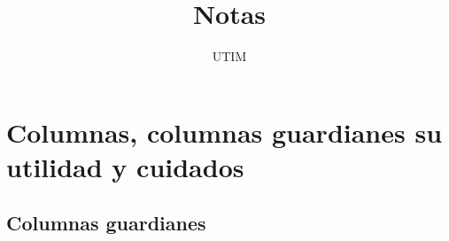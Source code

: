 \documentclass[11pt]{beamer}
\begin{document}
    \author{UTIM}
    \title{Notas}
    \begin{frame}[plain]
        \maketitle
    \end{frame}


    \section{Columnas, columnas guardianes su utilidad y cuidados}
      \subsection{Columnas guardianes}
\end{document}
